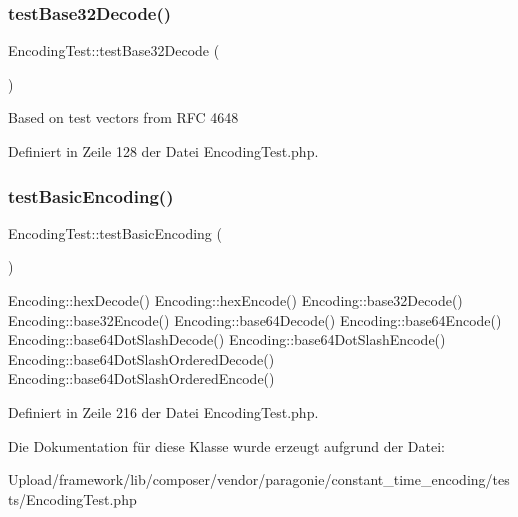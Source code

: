 \subsubsection{\texorpdfstring{test\+Base32\+Decode()}{testBase32Decode()}}
{\footnotesize\ttfamily Encoding\+Test\+::test\+Base32\+Decode (\begin{DoxyParamCaption}{ }\end{DoxyParamCaption})}

Based on test vectors from R\+FC 4648 

Definiert in Zeile 128 der Datei Encoding\+Test.\+php.

\mbox{\label{class_encoding_test_a05b6107e12034bc5cd886d4c4e560503}} 
\subsubsection{\texorpdfstring{test\+Basic\+Encoding()}{testBasicEncoding()}}
{\footnotesize\ttfamily Encoding\+Test\+::test\+Basic\+Encoding (\begin{DoxyParamCaption}{ }\end{DoxyParamCaption})}

Encoding\+::hex\+Decode()  Encoding\+::hex\+Encode()  Encoding\+::base32\+Decode()  Encoding\+::base32\+Encode()  Encoding\+::base64\+Decode()  Encoding\+::base64\+Encode()  Encoding\+::base64\+Dot\+Slash\+Decode()  Encoding\+::base64\+Dot\+Slash\+Encode()  Encoding\+::base64\+Dot\+Slash\+Ordered\+Decode()  Encoding\+::base64\+Dot\+Slash\+Ordered\+Encode() 

Definiert in Zeile 216 der Datei Encoding\+Test.\+php.



Die Dokumentation für diese Klasse wurde erzeugt aufgrund der Datei\+:\begin{DoxyCompactItemize}
\item 
Upload/framework/lib/composer/vendor/paragonie/constant\+\_\+time\+\_\+encoding/tests/Encoding\+Test.\+php\end{DoxyCompactItemize}

